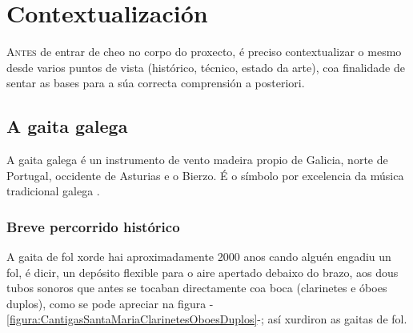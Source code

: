\chapter{Contextualización}
\minitoc
\label{chap:contextualizacion}
\vspace{0.5cm}


\lettrine{A}{ntes} de entrar de cheo no corpo do proxecto, é preciso
contextualizar o mesmo desde varios puntos de vista (histórico, técnico,
estado da arte), coa finalidade de sentar as bases para a súa correcta
comprensión a posteriori.

\section{A gaita galega}

A gaita galega é un instrumento de vento madeira propio de Galicia, norte de
Portugal, occidente de Asturias e o Bierzo. É o símbolo por excelencia da
música tradicional galega \cite{WikipediaGaitaGalega}.

 \subsection{Breve percorrido histórico}

 A gaita de fol xorde hai aproximadamente 2000 anos cando alguén engadiu un
 fol, é dicir, un depósito flexible para o aire apertado debaixo do brazo, aos
 dous tubos sonoros que antes se tocaban directamente coa boca (clarinetes e
 óboes duplos), como se pode apreciar na figura
 -\ref{figura:CantigasSantaMariaClarinetesOboesDuplos}-; así xurdiron as gaitas
 de fol.

